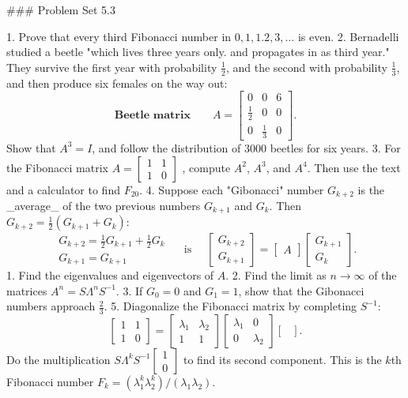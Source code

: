 

### Problem Set 5.3

1. Prove that every third Fibonacci number in \(0,1,1.2,3,\ldots\) is even.
2. Bernadelli studied a beetle "which lives three years only. and propagates in as third year." They survive the first year with probability \(\frac{1}{2}\), and the second with probability \(\frac{1}{3}\), and then produce six females on the way out: \[\textbf{Beetle matrix}\qquad A=\begin{bmatrix}0&0&6\\ \frac{1}{2}&0&0\\ 0&\frac{1}{3}&0\end{bmatrix}.\] Show that \(A^{3}=I\), and follow the distribution of 3000 beetles for six years.
3. For the Fibonacci matrix \(A=\begin{bmatrix}1&1\\ 1&0\end{bmatrix}\) , compute \(A^{2}\), \(A^{3}\), and \(A^{4}\). Then use the text and a calculator to find \(F_{20}\).
4. Suppose each "Gibonacci" number \(G_{k+2}\) is the _average_ of the two previous numbers \(G_{k+1}\) and \(G_{k}\). Then \(G_{k+2}=\frac{1}{2}(G_{k+1}+G_{k})\): \[\begin{array}{l}G_{k+2}=\frac{1}{2}G_{k+1}+\frac{1}{2}G_{k}\\ G_{k+1}=G_{k+1}\end{array}\quad\text{ is }\quad\begin{bmatrix}G_{k+2}\\ G_{k+1}\end{bmatrix}=\begin{bmatrix}A\end{bmatrix}\begin{bmatrix}G_{k+1}\\ G_{k}\end{bmatrix}.\] 1. Find the eigenvalues and eigenvectors of \(A\). 2. Find the limit as \(n\to\infty\) of the matrices \(A^{n}=S\Lambda^{n}S^{-1}\). 3. If \(G_{0}=0\) and \(G_{1}=1\), show that the Gibonacci numbers approach \(\frac{2}{3}\).
5. Diagonalize the Fibonacci matrix by completing \(S^{-1}\): \[\begin{bmatrix}1&1\\ 1&0\end{bmatrix}=\begin{bmatrix}\lambda_{1}&\lambda_{2}\\ 1&1\end{bmatrix}\begin{bmatrix}\lambda_{1}&0\\ 0&\lambda_{2}\end{bmatrix}\begin{bmatrix}\\ \end{bmatrix}.\] Do the multiplication \(S\Lambda^{k}S^{-1}\begin{bmatrix}1\\ 0\end{bmatrix}\) to find its second component. This is the \(k\)th Fibonacci number \(F_{k}=(\lambda_{1}^{k}\lambda_{2}^{k})/(\lambda_{1}\lambda_{2})\).
